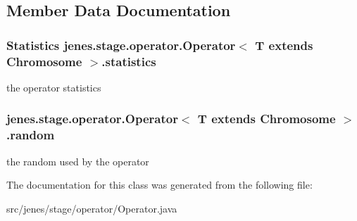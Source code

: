 \subsection{Member Data Documentation}
\hypertarget{classjenes_1_1stage_1_1operator_1_1_operator_3_01_t_01extends_01_chromosome_01_4_45afa214a1e9109845c8f67165942675}{
\subsubsection[statistics]{\setlength{\rightskip}{0pt plus 5cm}Statistics jenes.stage.operator.Operator$<$ T extends Chromosome $>$.{\bf statistics}}}
\label{classjenes_1_1stage_1_1operator_1_1_operator_3_01_t_01extends_01_chromosome_01_4_45afa214a1e9109845c8f67165942675}


the operator statistics \hypertarget{classjenes_1_1stage_1_1operator_1_1_operator_3_01_t_01extends_01_chromosome_01_4_f8cbd8837ce95101e238bdcc3dce5573}{
\subsubsection[random]{ jenes.stage.operator.Operator$<$ T extends Chromosome $>$.{\bf random}}}
\label{classjenes_1_1stage_1_1operator_1_1_operator_3_01_t_01extends_01_chromosome_01_4_f8cbd8837ce95101e238bdcc3dce5573}


the random used by the operator 

The documentation for this class was generated from the following file:\begin{CompactItemize}
\item 
src/jenes/stage/operator/Operator.java\end{CompactItemize}
